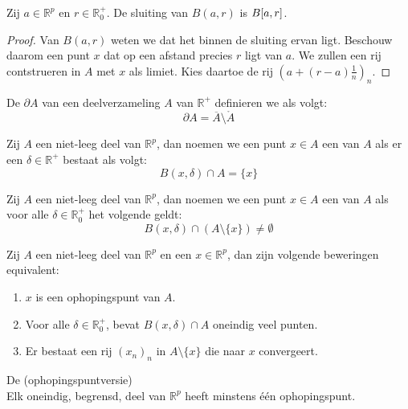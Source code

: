 \documentclass[main.tex]{subfiles}
\begin{document}
\begin{st}
  Zij $a\in \mathbb{R}^{p}$ en $r\in \mathbb{R}_{0}^{+}$.
  De sluiting van $B(a,r)$ is $B\interval{a}{r}$.

  \begin{proof}
    Van $B(a,r)$ weten we dat het binnen de sluiting ervan ligt.
    Beschouw daarom een punt $x$ dat op een afstand precies $r$ ligt van $a$.
    We zullen een rij contstrueren in $A$ met $x$ als limiet. 
    Kies daartoe de rij $(a + (r-a)\frac{1}{n})_{n}$.
  \end{proof}
\end{st}

\begin{de}
  De  $\partial A$ van een deelverzameling $A$ van $\mathbb{R}^{+}$ definieren we als volgt:
  \[ \partial A = \overline{A} \setminus \mathring{A} \]
\end{de}

\begin{de}
  Zij $A$ een niet-leeg deel van $\mathbb{R}^{p}$, dan noemen we een punt $x\in A$ een  van $A$ als er een $\delta \in \mathbb{R}^{+}$ bestaat als volgt:
  \[ B(x,\delta) \cap A = \{x\} \]
\end{de}

\begin{de}
  Zij $A$ een niet-leeg deel van $\mathbb{R}^{p}$, dan noemen we een punt $x\in A$ een  van $A$ als voor alle $\delta \in \mathbb{R}^{+}_{0}$ het volgende geldt:
  \[ B(x,\delta) \cap (A \setminus \{x\}) \neq \emptyset \]
\end{de}


\begin{pr}
  Zij $A$ een niet-leeg deel van $\mathbb{R}^{p}$ en een $x\in \mathbb{R}^{p}$, dan zijn volgende beweringen equivalent:
  \begin{enumerate}
  \item $x$ is een ophopingspunt van $A$.
  \item Voor alle $\delta \in \mathbb{R}_{0}^{+}$, bevat $B(x,\delta) \cap A$ oneindig veel punten.
  \item Er bestaat een rij $(x_{n})_{n}$ in $A\setminus \{ x\}$ die naar $x$ convergeert.
  \end{enumerate}
\end{pr}


\begin{st}
  De  (ophopingspuntversie)\\
  Elk oneindig, begrensd, deel van $\mathbb{R}^{p}$ heeft minstens \'e\'en ophopingspunt.
\end{st}
\end{document}
